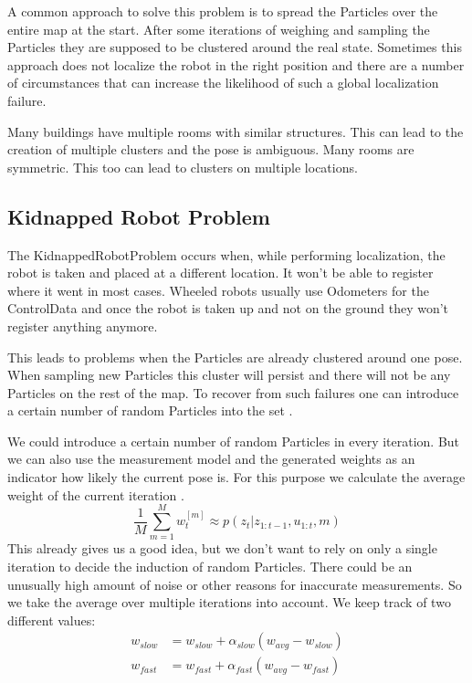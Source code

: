 A common approach to solve this problem is to spread the \gls{Particle}s over the entire map at the start. After some iterations of weighing and sampling the \gls{Particle}s they are supposed to be clustered around the real state. Sometimes this approach does not localize the robot in the right position and there are a number of circumstances that can increase the likelihood of such a global localization failure.

Many buildings have multiple rooms with similar structures. This can lead to the creation of multiple clusters and the pose is ambiguous. Many rooms are symmetric. This too can lead to clusters on multiple locations. 
\subsection{Kidnapped Robot Problem} \label{sec:krp}
The \gls{KidnappedRobotProblem} occurs when, while performing localization, the robot is taken and placed at a different location. It won't be able to register where it went in most cases. Wheeled robots usually use \gls{Odometer}s for the \gls{ControlData} and once the robot is taken up and not on the ground they won't register anything anymore. 

This leads to problems when the \gls{Particle}s are already clustered around one pose. When sampling new \gls{Particle}s this cluster will persist and there will not be any \gls{Particle}s on the rest of the map. To recover from such failures one can introduce a certain number of random \gls{Particle}s into the set \citep[p.\ 256]{Thrun:2005:PR:1121596}.

We could introduce a certain number of random \gls{Particle}s in every iteration. But we can also use the measurement model and the generated weights as an indicator how likely the current pose is. For this purpose we calculate the average weight of the current iteration \citep[p.\ 257]{Thrun:2005:PR:1121596}.
\begin{equation}
\dfrac{1}{M}\sum_{m=1}^{M}w_t^{[m]} \approx p(z_t|z_{1:t-1},u_{1:t},m)
\end{equation}
This already gives us a good idea, but we don't want to rely on only a single iteration to decide the induction of random \gls{Particle}s. There could be an unusually high amount of noise or other reasons for inaccurate measurements. So we take the average over multiple iterations into account. We keep track of two different values:
\begin{equation}\label{eq:decay}
\begin{aligned}
w_{slow} &= w_{slow} + \alpha_{slow}(w_{avg}-w_{slow})\\
w_{fast} &= w_{fast} + \alpha_{fast}(w_{avg}-w_{fast})
\end{aligned}
\end{equation}

